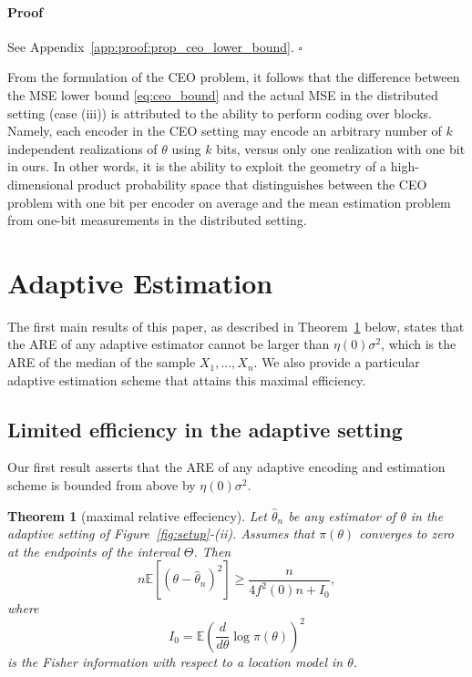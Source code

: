 \documentclass[letterpaper, 11pt]{IEEEtran}      %
\newtheorem{thm}{\bf{Theorem}}
\newenvironment{proof}{\paragraph*{Proof}}{\hfill$\square$ \newline}
\begin{document}
\begin{proof}
See Appendix~\ref{app:proof:prop_ceo_lower_bound}.
\end{proof}

From the formulation of the CEO problem, it follows that the difference between the MSE lower bound \eqref{eq:ceo_bound} and the actual MSE in the distributed setting (case (iii)) is attributed to the ability to perform coding over blocks. Namely, each encoder in the CEO setting may encode an arbitrary number of $k$ independent realizations of $\theta$ using $k$ bits, versus only one realization with one bit in ours. In other words, it is the ability to exploit the geometry of a high-dimensional product probability space that distinguishes between the CEO problem with one bit per encoder on average and the mean estimation problem from one-bit measurements in the distributed setting. 

\section{Adaptive Estimation \label{sec:sequential}}
The first main results of this paper, as described in Theorem~\ref{thm:adpative_lower_bound} below, states that the ARE of any adaptive estimator cannot be larger than $\eta(0)\sigma^2$, which is the ARE of the median of the sample $X_1,\ldots,X_n$. We also provide a particular adaptive estimation scheme that attains this maximal efficiency. %

\subsection{Limited efficiency in the adaptive setting}
Our first result asserts that the ARE of any adaptive encoding and estimation scheme is bounded from above by $\eta(0)\sigma^2$. %
\begin{thm}[maximal relative effeciency] \label{thm:adpative_lower_bound}
Let $\hat{\theta}_n$ be any estimator of $\theta$ in the adaptive setting of Figure~\ref{fig:setup}-(ii). Assumes that $\pi(\theta)$ converges to zero at the endpoints of the interval $\Theta$. Then
\[
n\mathbb E\left[ (\theta-\hat{\theta}_n)^2 \right] \geq   \frac{n}{ 4f^2(0) n + I_0},
\]
where 
\[
I_0 = \mathbb E \left( \frac{d}{d\theta} \log \pi (\theta) \right)^2
\]
is the Fisher information with respect to a location model in $\theta$. 
\end{thm}
\end{document}
